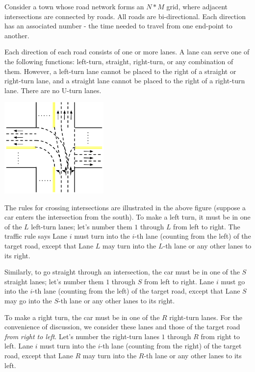 
Consider a town whose road network forms an $N * M$ grid, where adjacent intersections are connected by roads. All roads are bi-directional. Each direction has an associated number - the time needed to travel from one end-point to another.

Each direction of each road consists of one or more lanes. A lane can serve one of the following functions: left-turn, straight, right-turn, or any combination of them. However, a left-turn lane cannot be placed to the right of a straight or right-turn lane, and a straight lane cannot be placed to the right of a right-turn lane. There are no U-turn lanes.

\begin{center}
	\includegraphics[width=0.4\textwidth]{illustration.png}
\end{center}

The rules for crossing intersections are illustrated in the above figure (suppose a car enters the intersection from the south). To make a left turn, it must be in one of the $L$ left-turn lanes; let's number them $1$ through $L$ from left to right. The traffic rule says Lane $i$ must turn into the $i$-th lane (counting from the left) of the target road, except that Lane $L$ may turn into the $L$-th lane or any other lanes to its right. 

Similarly, to go straight through an intersection, the car must be in one of the $S$ straight lanes; let's number them $1$ through $S$ from left to right. Lane $i$ must go into the $i$-th lane (counting from the left) of the target road, except that Lane $S$ may go into the $S$-th lane or any other lanes to its right.

To make a right turn, the car must be in one of the $R$ right-turn lanes. For the convenience of discussion, we consider these lanes and those of the target road {\it from right to left}. Let's number the right-turn lanes $1$ through $R$ from right to left. Lane $i$ must turn into the $i$-th lane (counting from the right) of the target road, except that Lane $R$ may turn into the $R$-th lane or any other lanes to its left.

